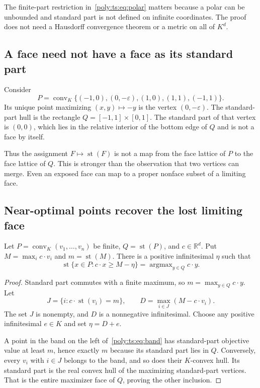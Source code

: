 \documentclass[11pt,a4paper]{article}
\numberwithin{equation}{section}
\theoremstyle{plain}
\newcommand{\R}{\mathbb R}
\newcommand{\eps}{\varepsilon}
\newcommand{\st}{\operatorname{st}}
\newcommand{\conv}{\operatorname{conv}}
\newcommand{\argmax}{\operatorname{argmax}}
\begin{document}
The finite-part restriction in~\eqref{poly:ts:eq:polar} matters because a polar
can be unbounded and standard part is not defined on infinite coordinates.
The proof does not need a Hausdorff convergence theorem or a metric on
all of $K^d$.

\subsection{A face need not have a face as its standard part}
Consider
\begin{equation}\label{poly:ts:eq:lostface}
 P=\conv_K\{(-1,0),(0,-\eps),(1,0),(1,1),(-1,1)\}.
\end{equation}
Its unique point maximizing $(x,y)\mapsto-y$ is the vertex $(0,-\eps)$.
The standard-part hull is the rectangle
$Q=[-1,1]\times[0,1]$. The standard part of that vertex is $(0,0)$,
which lies in the relative interior of the bottom edge of $Q$ and is not
a face by itself.

Thus the assignment $F\mapsto\st(F)$ is not a map from the face lattice
of $P$ to the face lattice of $Q$. This is stronger than the observation
that two vertices can merge. Even an exposed face can map to a proper
nonface subset of a limiting face.

\subsection{Near-optimal points recover the lost limiting face}
\begin{proposition}\label{poly:ts:prop:band}
Let $P=\conv_K(v_1,\ldots,v_n)$ be finite, $Q=\st(P)$, and
$c\in\R^d$. Put $M=\max_i c\cdot v_i$ and $m=\st(M)$. There is a
positive infinitesimal $\eta$ such that
\begin{equation}\label{poly:ts:eq:band}
 \st\{x\in P:c\cdot x\ge M-\eta\}
 =\argmax_{y\in Q}c\cdot y.
\end{equation}
\end{proposition}
\begin{proof}
Standard part commutes with a finite maximum, so
$m=\max_{y\in Q}c\cdot y$. Let
\[
 J=\{i:c\cdot\st(v_i)=m\},\qquad
 D=\max_{i\in J}(M-c\cdot v_i).
\]
The set $J$ is nonempty, and $D$ is a nonnegative infinitesimal. Choose
any positive infinitesimal $e\in K$ and set $\eta=D+e$.

A point in the band on the left of~\eqref{poly:ts:eq:band} has standard-part
objective value at least $m$, hence exactly $m$ because its standard
part lies in $Q$. Conversely, every $v_i$ with $i\in J$ belongs to the
band, and so does their $K$-convex hull. Its standard part is the real
convex hull of the maximizing standard-part vertices. That is the entire
maximizer face of $Q$, proving the other inclusion.
\end{proof}
\end{document}
